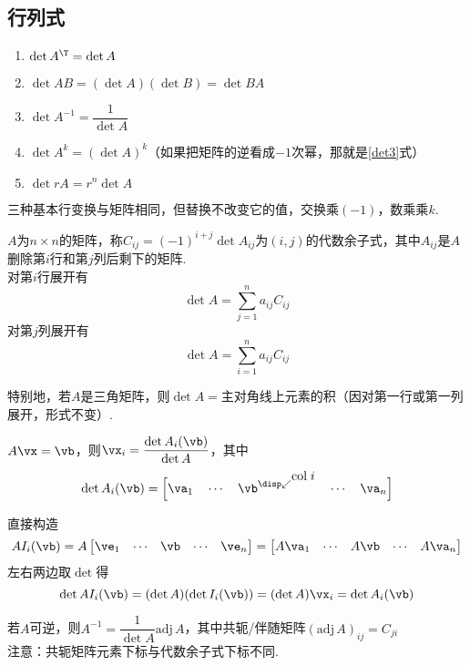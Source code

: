 \subsection{行列式}
\begin{proposition}[行列式的基本运算]\mbox{}\par
\begin{enumerate}
	\item $\det A^\T=\det A$
	\item $\det AB=(\det A)(\det B)=\det BA$
	\item \label{det3}$\det A^{-1}=\dfrac{1}{\det A}$
	\item $\det A^k=(\det A)^k$（如果把矩阵的逆看成$-1$次幂，那就是\ref{det3}式）
	\item $\det rA=r^n\det A$
\end{enumerate}
\end{proposition}
\begin{proposition}[行列式基本行变换]
三种基本行变换与矩阵相同，但替换不改变它的值，交换乘$(-1)$，数乘乘$k$.
\end{proposition}
\begin{theorem}
$A$为$n\times n$的矩阵，称$C_{ij}=(-1)^{i+j}\det A_{ij}$为$(i,j)$的代数余子式，其中$A_{ij}$是$A$删除第$i$行和第$j$列后剩下的矩阵.\\
对第$i$行展开有
\[\det A=\sum_{j=1}^{n}a_{ij}C_{ij}\]
对第$j$列展开有
\[\det A=\sum_{i=1}^{n}a_{ij}C_{ij}\]
\end{theorem}
特别地，若$A$是三角矩阵，则$\det A=$主对角线上元素的积（因对第一行或第一列展开，形式不变）.
\begin{theorem}
$A\vx=\vb$，则$\vx_i=\dfrac{\det A_i(\vb)}{\det A}$，其中\[\det A_i(\vb)=\Big[\va_1\quad\cdots\quad\vb^{\disp\swarrow\raisebox{0.5em}{$\mathrm{col}\;i$}}\quad\cdots\quad\va_n\Big]\]
\end{theorem}
\begin{analysis}直接构造
\[AI_i(\vb)=A\begin{bmatrix}\ve_1&\cdots&\vb&\cdots&\ve_n\end{bmatrix}=\begin{bmatrix}A\va_1&\cdots& A\vb&\cdots& A\va_n\end{bmatrix}\]
左右两边取$\det$得
\[\det AI_i(\vb)=(\det A)(\det I_i(\vb))=(\det A)\vx_i=\det A_i(\vb)\]
\end{analysis}
\begin{theorem}
若$A$可逆，则$A^{-1}=\dfrac{1}{\det A}\mathrm{adj}\,A$，其中共轭/伴随矩阵$(\mathrm{adj}\,A)_{ij}=C_{ji}$\\
注意：共轭矩阵元素下标与代数余子式下标不同.
\end{theorem}
